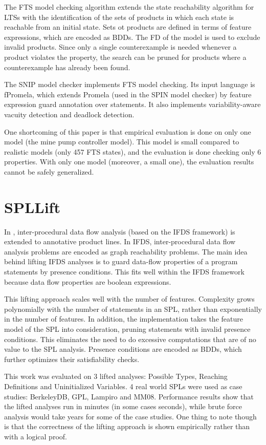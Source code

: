 \documentclass[11pt]{article}
\begin{document}
The FTS model checking algorithm extends the state reachability algorithm for LTSs with the identification of the sets of products in which each state is reachable from an initial state. Sets ot products are defined in terms of feature expressions, which are encoded as BDDs. The FD of the model is used to exclude invalid products. Since only a single counterexample is needed whenever a product violates the property, the search can be pruned for products where a counterexample has already been found.

The SNIP model checker implements FTS model checking. Its input language is fPromela, which extends Promela (used in the SPIN model checker) by feature expression guard annotation over statements. It also implements variability-aware vacuity detection and deadlock detection.

One shortcoming of this paper is that empirical evaluation is done on only one model (the mine pump controller model). This model is small compared to realistic models (only 457 FTS states), and the evaluation is done checking only 6 properties. With only one model (moreover, a small one), the evaluation results cannot be safely generalized. 
 
\section{SPLLift}

In \cite{Bodden:2013}, inter-procedural data flow analysis (based on the IFDS \cite{Reps:1995} framework) is extended to annotative product lines. In IFDS, inter-procedural data flow analysis problems are encoded as graph reachability problems. The main idea behind lifting IFDS analyses is to guard data-flow properties of a program statements by presence conditions. This fits well within the IFDS framework because data flow properties are boolean expressions.

This lifting approach scales well with the number of features. Complexity grows polynomially with the number of statements in an SPL, rather than exponentially in the number of features. In addition, the implementation takes the feature model of the SPL into consideration, pruning statements with invalid presence conditions. This eliminates the need to do excessive computations that are of no value to the SPL analysis. Presence conditions are encoded as BDDs, which further optimizes their satisfiability checks.

This work was evaluated on 3 lifted analyses: Possible Types, Reaching Definitions and Uninitialized Variables. 4 real world SPLs were used as case studies: BerkeleyDB, GPL, Lampiro and MM08. Performance results show that the lifted analyses run in minutes (in some cases seconds), while brute force analysis would take years for some of the case studies. One thing to note though is that the correctness of the lifting approach is shown empirically rather than with a logical proof.
\end{document}
